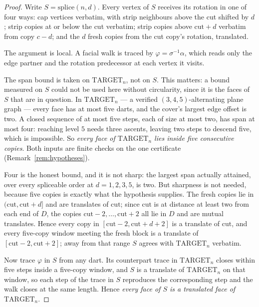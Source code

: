 \documentclass[11pt,a4paper]{amsart}
\theoremstyle{plain}
\theoremstyle{definition}
\begin{document}
\begin{proof}
Write $S = \mathrm{splice}(n,d)$. Every vertex of $S$ receives its rotation in
one of four ways: cap vertices verbatim, with strip neighbours above the cut
shifted by $d$; strip copies at or below the cut verbatim; strip copies above
$\mathrm{cut}+d$ verbatim from copy $c-d$; and the $d$ fresh copies from the cut
copy's rotation, translated.

The argument is local. A facial walk is traced by
$\varphi = \sigma^{-1}\alpha$, which reads only the edge partner and the
rotation predecessor at each vertex it visits.

The span bound is taken on $\mathrm{TARGET}_n$, not on $S$. This matters: a
bound measured on $S$ could not be used here without circularity, since it is
the faces of $S$ that are in question. In $\mathrm{TARGET}_n$ --- a verified
$(3,4,5)$-alternating plane graph --- every face has at most five darts, and the
cover's largest edge offset is two. A closed sequence of at most five steps, each
of size at most two, has span at most four: reaching level $5$ needs three
ascents, leaving two steps to descend five, which is impossible. So \emph{every
face of $\mathrm{TARGET}_n$ lies inside five consecutive copies}. Both inputs
are finite checks on the one certificate (Remark~\ref{rem:hypotheses}).

Four is the honest bound, and it is not sharp: the largest span actually
attained, over every spliceable order at $d = 1,2,3,5$, is two. But sharpness is
not needed, because five copies is exactly what the hypothesis supplies. The
fresh copies lie in $(\mathrm{cut}, \mathrm{cut}+d]$ and are translates of
$\mathrm{cut}$; since $\mathrm{cut}$ is at distance at least two from each end
of $D$, the copies $\mathrm{cut}-2,\dots,\mathrm{cut}+2$ all lie in $D$ and are
mutual translates. Hence every copy in $[\mathrm{cut}-2, \mathrm{cut}+d+2]$ is a
translate of $\mathrm{cut}$, and every five-copy window meeting the fresh block
is a translate of $[\mathrm{cut}-2,\mathrm{cut}+2]$; away from that range $S$
agrees with $\mathrm{TARGET}_n$ verbatim.

Now trace $\varphi$ in $S$ from any dart. Its counterpart trace in
$\mathrm{TARGET}_n$ closes within five steps inside a five-copy window, and $S$
is a translate of $\mathrm{TARGET}_n$ on that window, so each step of the trace
in $S$ reproduces the corresponding step and the walk closes at the same length.
Hence \emph{every face of $S$ is a translated face of $\mathrm{TARGET}_n$}.


\end{proof}
\end{document}
